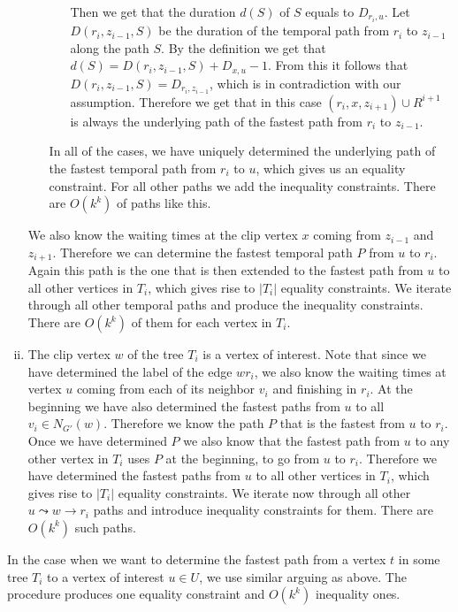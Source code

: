 \documentclass[11pt,a4paper]{article}
\theoremstyle{remark}
\theoremstyle{definition}
\begin{document}
\begin{enumerate}[(i)]
\begin{itemize}
\begin{itemize}
            Then we get that the duration $d(S)$ of $S$ equals to $D_{r_i,u}$.
            Let $D(r_i,z_{i-1},S)$ be the duration of the temporal path from $r_i$ to $z_{i-1}$ along the path $S$.
            By the definition we get that $d(S) = D(r_i,z_{i-1},S) + D_{x,u} - 1$.
            From this it follows that $D(r_i,z_{i-1},S) = D_{r_i, z_{i-1}}$, which is in contradiction with our assumption.
            Therefore we get that in this case 
            $(r_i, x, z_{i+1}) \cup R^{i+1}$ is always the underlying path of the fastest path from $r_i$ to $z_{i-1}$.
        \end{itemize}
       In all of the cases, we have uniquely determined the underlying path of the fastest temporal path from $r_i$ to $u$,
       which gives us an equality constraint.
       For all other paths we add the inequality constraints. 
       There are $O(k^k)$ of paths like this.
    \end{itemize}
    We also know the waiting times at the clip vertex $x$ coming from $z_{i-1}$ and $z_{i+1}$. Therefore we can determine the fastest temporal path $P$ from $u$ to $r_i$.
    Again this path is the one that is then extended to the fastest path from $u$ to all other vertices in $T_i$,
    which gives rise to $|T_i|$ equality constraints.
    We iterate through all other temporal paths and produce the inequality constraints.
    There are $O(k^k)$ of them for each vertex in $T_i$.
    
    \item The clip vertex $w$ of the tree $T_i$ is a vertex of interest.
    Note that since we have determined the label of the edge $w r_i$, we also know the waiting times 
    at vertex $u$ coming from each of its neighbor $v_i$ and finishing in $r_i$. 
    At the beginning we have also determined the fastest paths from $u$ to all $v_i \in N_{G'}(w)$.
    Therefore we know the path $P$ that is the fastest from $u$ to $r_i$. 
    Once we have determined $P$ we also know that the fastest path from $u$ to any other vertex in $T_i$ uses $P$ at the beginning, to go from $u$ to $r_i$.
    Therefore we have determined the fastest paths from $u$ to all other vertices in $T_i$,
    which gives rise to $|T_i|$ equality constraints.
    We iterate now through all other $u \leadsto w \rightarrow r_i$ paths and introduce inequality constraints for them.
    There are $O(k^k)$ such paths.
\end{enumerate}

In the case when we want to determine the fastest path from a vertex $t$ in some tree $T_i$ to a vertex of interest $u \in U$,
we use similar arguing as above.
The procedure produces one equality constraint and $O(k^k)$ inequality ones.
\end{document}
